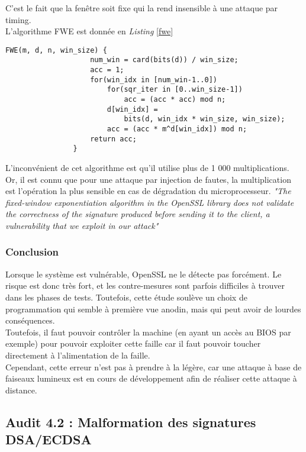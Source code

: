 			C'est le fait que la fenêtre soit fixe qui la rend insensible à une attaque par timing.\\

			L'algorithme FWE est donnée en \textit{Listing} \ref{fwe}
		
			\begin{lstlisting}[style=customc,caption=fwe.c, label=fwe]
				FWE(m, d, n, win_size) {
					num_win = card(bits(d)) / win_size;
					acc = 1;
					for(win_idx in [num_win-1..0])
						for(sqr_iter in [0..win_size-1])
							acc = (acc * acc) mod n;
						d[win_idx] =
							bits(d, win_idx * win_size, win_size);
						acc = (acc * m^d[win_idx]) mod n;
					return acc;
				}
			\end{lstlisting}
		

			L'inconvénient de cet algorithme est qu'il utilise plus de 1 000 multiplications. Or, il est connu que pour une attaque par injection de fautes, la multiplication est l'opération la plus sensible en cas de dégradation du microprocesseur. \textit{"The fixed-window exponentiation algorithm in the OpenSSL library does not validate the correctness of the signature produced before sending it to the client, a vulnerability that we exploit in our attack"}\\
			

		\subsubsection{Conclusion}

			Lorsque le système est vulnérable, OpenSSL ne le détecte pas forcément. Le risque est donc très fort, et les contre-mesures sont parfois difficiles à trouver dans les phases de tests. Toutefois, cette étude soulève un choix de programmation qui semble à première vue anodin, mais qui peut avoir de lourdes conséquences.\\

			Toutefois, il faut pouvoir contrôler la machine (en ayant un accès au BIOS par exemple) pour pouvoir exploiter cette faille car il faut pouvoir toucher directement à l'alimentation de la faille.\\

			Cependant, cette erreur n'est pas à prendre à la légère, car une attaque à base de faiseaux lumineux est en cours de développement afin de réaliser cette attaque à distance.
		
\subsection{Audit 4.2 : Malformation des signatures DSA/ECDSA}
